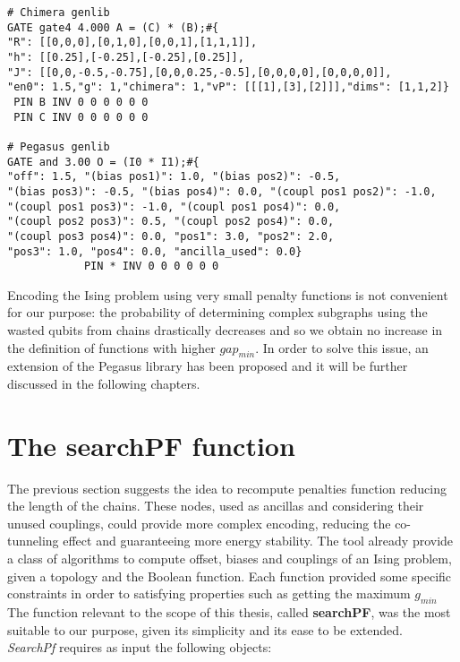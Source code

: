  \begin{lstlisting}[style=interfaces,caption=The definition of the penalty function \text{$A = B \wedge C$} according to the Chimera and Pegasus libraries. While the conversion of most data would be trivial (in particular weights of biases and couplings) it would be difficult to map Chimera encodings (which are mapped using Chimera tiles as basic unit) into Pegasus (which does not provide the concept of tile).]
# Chimera genlib
GATE gate4 4.000 A = (C) * (B);#{
"R": [[0,0,0],[0,1,0],[0,0,1],[1,1,1]],
"h": [[0.25],[-0.25],[-0.25],[0.25]],
"J": [[0,0,-0.5,-0.75],[0,0,0.25,-0.5],[0,0,0,0],[0,0,0,0]],
"en0": 1.5,"g": 1,"chimera": 1,"vP": [[[1],[3],[2]]],"dims": [1,1,2]}
 PIN B INV 0 0 0 0 0 0
 PIN C INV 0 0 0 0 0 0
 
# Pegasus genlib
GATE and 3.00 O = (I0 * I1);#{
"off": 1.5, "(bias pos1)": 1.0, "(bias pos2)": -0.5, 
"(bias pos3)": -0.5, "(bias pos4)": 0.0, "(coupl pos1 pos2)": -1.0,
"(coupl pos1 pos3)": -1.0, "(coupl pos1 pos4)": 0.0,
"(coupl pos2 pos3)": 0.5, "(coupl pos2 pos4)": 0.0, 
"(coupl pos3 pos4)": 0.0, "pos1": 3.0, "pos2": 2.0, 
"pos3": 1.0, "pos4": 0.0, "ancilla_used": 0.0}
            PIN * INV 0 0 0 0 0 0
\end{lstlisting}

 Encoding the Ising problem using very small penalty functions is not convenient for our purpose: the probability of determining complex subgraphs using the wasted qubits from chains drastically decreases and so we obtain no increase in the definition of functions with higher $gap_{min}$. In order to solve this issue, an extension of the Pegasus library has been proposed and it will be further discussed in the following chapters.


\section{The searchPF function}

The previous section suggests the idea to recompute penalties function reducing the length of the chains. These nodes, used as ancillas and considering their unused couplings, could provide more complex encoding, reducing the co-tunneling effect and guaranteeing more energy stability. The tool already provide a class of algorithms to compute offset, biases and couplings of an Ising problem, given a topology and the Boolean function. Each function provided some specific constraints in order to satisfying properties such as getting the maximum $g_{min}$  The function relevant to the scope of this thesis, called \textbf{searchPF}, was the most suitable to our purpose, given its simplicity and its ease to be extended. \\
\textit{SearchPf} requires as input the following objects:

